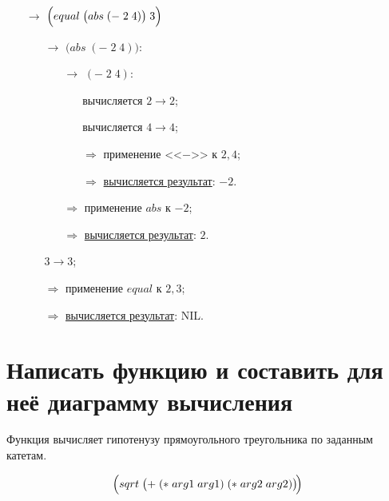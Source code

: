 \begin{itemize}
	\item[$\longrightarrow$] $\Bigl(equal\; \bigl(abs\; (-\; 2\; 4)\bigr)\; 3\Bigr)$
	\begin{itemize}
		\item[$\longrightarrow$] $\bigl(abs\; (-\; 2\; 4)\bigr)$:
		\begin{itemize}
			\item[$\longrightarrow$] $(-\; 2\; 4)$:
			\begin{itemize}
				\item[\textbullet] вычисляется $2 \to 2$;
				\item[\textbullet] вычисляется $4 \to 4$;
				\item[$\Longrightarrow$] применение <<$-$>> к $2, 4$;
				\item[$\Longrightarrow$] \underline{вычисляется результат}: $-2$.
			\end{itemize}
			\item[$\Longrightarrow$] применение $abs$ к $-2$;
			\item[$\Longrightarrow$] \underline{вычисляется результат}: $2$.
		\end{itemize}
		\item[\textbullet] $3 \to 3$;
		\item[$\Longrightarrow$] применение $equal$ к $2, 3$;
		\item[$\Longrightarrow$] \underline{вычисляется результат}: NIL.
	\end{itemize}
\end{itemize}



\section{Написать функцию и составить для неё диаграмму вычисления}

\problem Функция вычисляет гипотенузу прямоугольного треугольника по заданным катетам.
\vfill

\vfill

\[
	\Bigl(sqrt\; \bigl(+\; (*\; arg1\; arg1)\; (*\; arg2\; arg2)\bigr)\!\Bigr)
\]
\vfill

